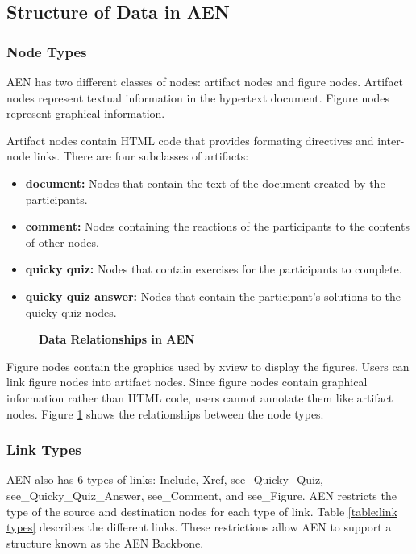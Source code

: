 \subsection{Structure of Data in AEN}

\subsubsection{Node Types}
AEN has two different classes of nodes: artifact
nodes and figure nodes.  Artifact nodes represent textual information in
the hypertext document.  Figure nodes represent graphical information. 

Artifact nodes contain HTML code that provides formating directives and
inter-node links.  There are four subclasses of artifacts:
\begin{itemize}
\item{\bf document:} Nodes that contain the text of the document created by
the participants.
\item{\bf comment:} Nodes containing the reactions of the participants to
the contents of other nodes.
\item{\bf quicky quiz:} Nodes that contain exercises for the participants
to complete.
\item{\bf quicky quiz answer:} Nodes that contain the participant's
solutions to the quicky quiz nodes.
\end{itemize}


\begin{figure}[htb]
  \centerline{}
  \caption{{\bf Data Relationships in AEN}}
  \label{fig:Data}
\end{figure}

Figure nodes contain the graphics used by xview to display the figures.
Users can link figure nodes into artifact nodes.  Since figure nodes
contain graphical information rather than HTML code, users cannot annotate
them like artifact nodes.  Figure \ref{fig:Data} shows the relationships
between the node types.

\subsubsection{Link Types}
AEN also has 6 types of links: Include, Xref,
see\_Quicky\_Quiz, see\_Quicky\_Quiz\_Answer, see\_Comment, and
see\_Figure.  AEN restricts the type of the source and destination nodes
for each type of link. Table \ref{table:link types} describes the different
links.  These restrictions allow AEN to support a structure known as the
AEN Backbone.

